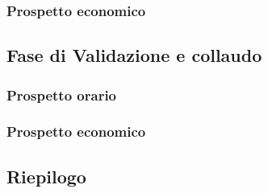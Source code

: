 \subsubsection{Prospetto economico}

\subsection{Fase di Validazione e collaudo}
\subsubsection{Prospetto orario}

\subsubsection{Prospetto economico}

\subsection{Riepilogo}
